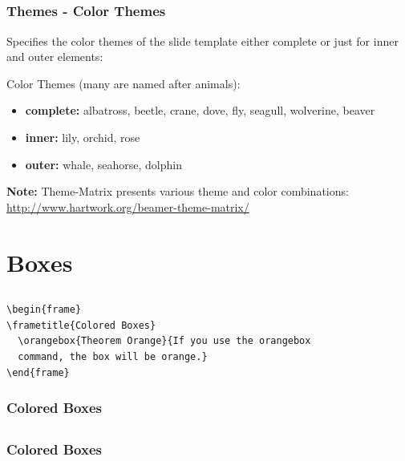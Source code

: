 \documentclass[[newPxFont]{beamer}
\begin{document}
\subsection{}
\begin{frame}
  \frametitle{Themes - Color Themes}
  Specifies the color themes of the slide template either complete or
just for inner and outer elements:
 \begin{block}{Color Themes (many are named after animals):}
   \begin{itemize}
    \item \textbf{complete:} albatross, beetle, crane, dove, fly, seagull, wolverine, beaver
    \item \textbf{ inner:} lily, orchid, rose
  \item \textbf{ outer:} whale, seahorse, dolphin
  \end{itemize}
  \end{block}
  \textbf{\color{green} Note:} Theme-Matrix presents various theme and color combinations:
\url{http://www.hartwork.org/beamer-theme-matrix/}
\end{frame}
\section{Boxes}
\subsection{}
\begin{frame}[fragile=singleslide]
\begin{verbatim}
\begin{frame}
\frametitle{Colored Boxes}
  \orangebox{Theorem Orange}{If you use the orangebox 
  command, the box will be orange.}
\end{frame} 
\end{verbatim}
\frametitle{Colored Boxes}
\end{frame}


\subsection{}
\begin{frame}
\frametitle{Colored Boxes}





\end{frame}
\end{document}
